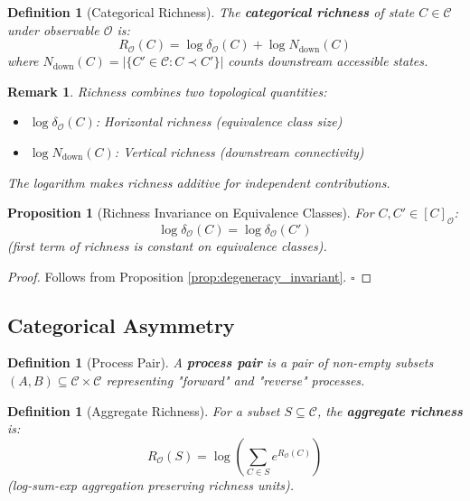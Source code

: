 \documentclass[12pt,a4paper]{article}
\newtheorem{proposition}[theorem]{Proposition}
\newtheorem{definition}[theorem]{Definition}
\newtheorem{remark}[theorem]{Remark}
\begin{document}
\begin{definition}[Categorical Richness]
\label{def:richness}
The \textbf{categorical richness} of state $C \in \mathcal{C}$ under observable $\mathcal{O}$ is:
\begin{equation}
R_{\mathcal{O}}(C) = \log \delta_{\mathcal{O}}(C) + \log N_{\text{down}}(C)
\end{equation}
where $N_{\text{down}}(C) = |\{C' \in \mathcal{C} : C \prec C'\}|$ counts downstream accessible states.
\end{definition}

\begin{remark}
Richness combines two topological quantities:
\begin{itemize}
\item $\log \delta_{\mathcal{O}}(C)$: Horizontal richness (equivalence class size)
\item $\log N_{\text{down}}(C)$: Vertical richness (downstream connectivity)
\end{itemize}
The logarithm makes richness additive for independent contributions.
\end{remark}

\begin{proposition}[Richness Invariance on Equivalence Classes]
\label{prop:richness_invariant}
For $C, C' \in [C]_{\mathcal{O}}$:
\begin{equation}
\log \delta_{\mathcal{O}}(C) = \log \delta_{\mathcal{O}}(C')
\end{equation}
(first term of richness is constant on equivalence classes).
\end{proposition}

\begin{proof}
Follows from Proposition \ref{prop:degeneracy_invariant}. $\square$
\end{proof}

\subsection{Categorical Asymmetry}

\begin{definition}[Process Pair]
\label{def:process_pair}
A \textbf{process pair} is a pair of non-empty subsets $(A, B) \subseteq \mathcal{C} \times \mathcal{C}$ representing "forward" and "reverse" processes.
\end{definition}

\begin{definition}[Aggregate Richness]
\label{def:aggregate_richness}
For a subset $S \subseteq \mathcal{C}$, the \textbf{aggregate richness} is:
\begin{equation}
R_{\mathcal{O}}(S) = \log \left( \sum_{C \in S} e^{R_{\mathcal{O}}(C)} \right)
\end{equation}
(log-sum-exp aggregation preserving richness units).
\end{definition}
\end{document}
